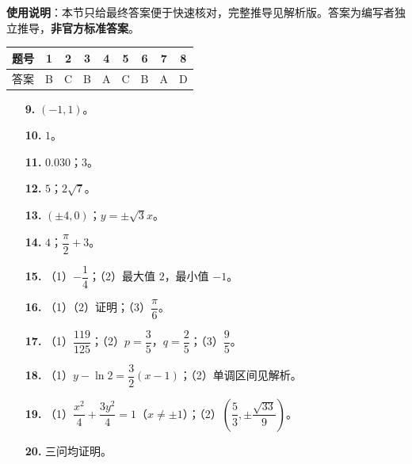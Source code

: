 
\begin{gknotice}
\textbf{使用说明}：本节只给最终答案便于快速核对，完整推导见解析版。答案为编写者独立推导，\textbf{非官方标准答案}。
\end{gknotice}

\begin{center}\begin{tabular}{ccccccccc}
\toprule
题号 & 1 & 2 & 3 & 4 & 5 & 6 & 7 & 8 \\
\midrule
答案 & B & C & B & A & C & B & A & D \\
\bottomrule
\end{tabular}\end{center}

\begin{itemize}[leftmargin=2.6em]
  \item[\textbf{9.}] $(-1,1)$。
  \item[\textbf{10.}] $1$。
  \item[\textbf{11.}] $0.030$；$3$。
  \item[\textbf{12.}] $5$；$2\sqrt7$。
  \item[\textbf{13.}] $(\pm4,0)$；$y=\pm\sqrt3x$。
  \item[\textbf{14.}] $4$；$\dfrac\pi2+3$。
\end{itemize}

\begin{itemize}[leftmargin=2.6em]
  \item[\textbf{15.}] （1）$-\dfrac14$；（2）最大值 $2$，最小值 $-1$。
  \item[\textbf{16.}] （1）（2）证明；（3）$\dfrac\pi6$。
  \item[\textbf{17.}] （1）$\dfrac{119}{125}$；（2）$p=\dfrac35$，$q=\dfrac25$；（3）$\dfrac95$。
  \item[\textbf{18.}] （1）$y-\ln2=\dfrac32(x-1)$；（2）单调区间见解析。
  \item[\textbf{19.}] （1）$\dfrac{x^2}4+\dfrac{3y^2}4=1$（$x\neq\pm1$）；（2）$\left(\dfrac53,\pm\dfrac{\sqrt{33}}9\right)$。
  \item[\textbf{20.}] 三问均证明。
\end{itemize}
